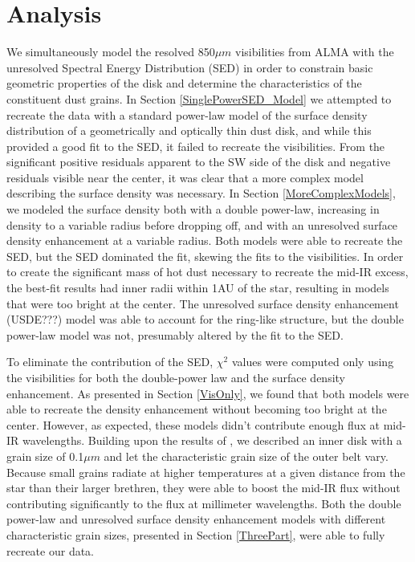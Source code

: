 \chapter{Analysis}
\label{chap4}

We simultaneously model the resolved 850$\mu m$ visibilities from ALMA with the unresolved Spectral Energy Distribution (SED) in order to constrain basic geometric properties of the disk and determine the characteristics of the constituent dust grains. In Section \ref{SinglePowerSED_Model} we attempted to recreate the data with a standard power-law model of the surface density distribution of a geometrically and optically thin dust disk, and while this provided a good fit to the SED, it failed to recreate the visibilities. From the significant positive residuals apparent to the SW side of the disk and negative residuals visible near the center, it was clear that a more complex model describing the surface density was necessary. In Section \ref{MoreComplexModels}, we modeled the surface density both with a double power-law, increasing in density to a variable radius before dropping off, and with an unresolved surface density enhancement at a variable radius. Both models were able to recreate the SED, but the SED dominated the fit, skewing the fits to the visibilities. In order to create the significant mass of hot dust necessary to recreate the mid-IR excess, the best-fit results had inner radii within 1AU of the star, resulting in models that were too bright at the center. The unresolved surface density enhancement (USDE???) model was able to account for the ring-like structure, but the double power-law model was not, presumably altered by the fit to the SED. 

To eliminate the contribution of the SED, $\chi^{2}$ values were computed only using the visibilities for both the double-power law and the surface density enhancement. As presented in Section \ref{VisOnly}, we found that both models were able to recreate the density enhancement without becoming too bright at the center. However, as expected, these models didn't contribute enough flux at mid-IR wavelengths. Building upon the results of \cite{Wahh07}, we described an inner disk with a grain size of 0.1$\mu m$ and let the characteristic grain size of the outer belt vary. Because small grains radiate at higher temperatures at a given distance from the star than their larger brethren, they were able to boost the mid-IR flux without contributing significantly to the flux at millimeter wavelengths. Both the double power-law and unresolved surface density enhancement models with different characteristic grain sizes, presented in Section \ref{ThreePart}, were able to fully recreate our data. 

